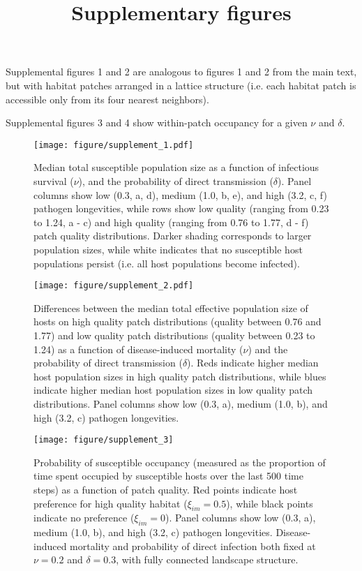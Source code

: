 \documentclass{article}
\title{Supplementary figures}
\begin{document}
\maketitle

Supplemental figures 1 and 2 are analogous to figures 1 and 2 from the main text, but with habitat patches arranged in a lattice structure (i.e. each habitat patch is accessible only from its four nearest neighbors).

Supplemental figures 3 and 4 show within-patch occupancy for a given $\nu$ and $\delta$.

\begin{figure}
\texttt{[image: figure/supplement\_1.pdf]}
\caption{Median total susceptible population size as a function of infectious survival ($\nu$), and the probability of direct transmission ($\delta$).  Panel columns show low (0.3, a, d), medium (1.0, b, e), and high (3.2, c, f) pathogen longevities, while rows show low quality (ranging from 0.23 to 1.24, a - c) and high quality (ranging from 0.76 to 1.77, d - f) patch quality distributions.  Darker shading corresponds to larger population sizes, while white indicates that no susceptible host populations persist (i.e. all host populations become infected).}
\label{endemic}
\end{figure}

\begin{figure}
\texttt{[image: figure/supplement\_2.pdf]}
\centering
\caption{Differences between the median total effective population size of hosts on high quality patch distributions (quality between 0.76 and 1.77) and low quality patch distributions (quality between 0.23 to 1.24) as a function of disease-induced mortality ($\nu$) and the probability of direct transmission ($\delta$).  Reds indicate higher median host population sizes in high quality patch distributions, while blues indicate higher median host population sizes in low quality patch distributions.  Panel columns show low (0.3, a), medium (1.0, b), and high (3.2, c) pathogen longevities.}
\label{highvlow}
\end{figure}

\begin{figure}
\texttt{[image: figure/supplement\_3]}
\centering
\caption{Probability of susceptible occupancy (measured as the proportion of time spent occupied by susceptible hosts over the last 500 time steps) as a function of patch quality. Red points indicate host preference for high quality habitat ($\xi_{im} = 0.5$), while black points indicate no preference ($\xi_{im} = 0$). Panel columns show low (0.3, a), medium (1.0, b), and high (3.2, c) pathogen longevities.  Disease-induced mortality and probability of direct infection both fixed at $\nu = 0.2$ and $\delta = 0.3$, with fully connected landscape structure.}
\end{figure}
\end{document}
